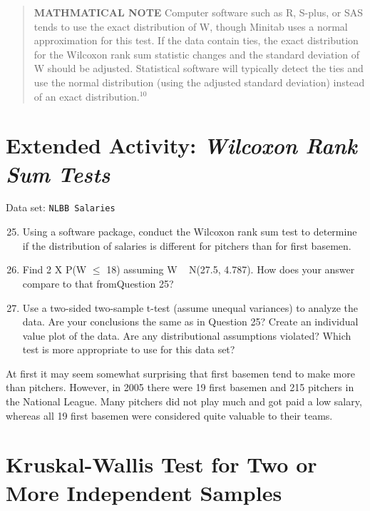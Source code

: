 \documentclass[
]{report}
\begin{document}
\begin{quote}
\textbf{MATHMATICAL NOTE} Computer software such as R, S-plus, or SAS tends to use the exact distribution of W, though Minitab uses a normal approximation for this test. If the data contain ties, the exact distribution for the Wilcoxon rank sum statistic changes and the standard deviation of W should be adjusted. Statistical software will typically detect the ties and use the normal distribution (using the adjusted standard deviation) instead of an exact distribution.\(^{10}\)
\end{quote}

\hypertarget{extended-activity-wilcoxon-rank-sum-tests}{%
\section*{\texorpdfstring{Extended Activity: \emph{Wilcoxon Rank Sum Tests}}{Extended Activity: Wilcoxon Rank Sum Tests}}\label{extended-activity-wilcoxon-rank-sum-tests}}

Data set: \texttt{NLBB\ Salaries}

\begin{enumerate}
 \setcounter{enumi}{24}
 \item Using a software package, conduct the Wilcoxon rank sum test to determine if the distribution of salaries is different for pitchers than for first basemen.
 \item Find 2 X P(W $\leq$ 18) assuming W ~ N(27.5, 4.787). How does your answer compare to that fromQuestion 25?
 \item Use a two-sided two-sample t-test (assume unequal variances) to analyze the data. Are your conclusions the same as in Question 25? Create an individual value plot of the data. Are any distributional assumptions violated? Which test is more appropriate to use for this data set?
\end{enumerate}

At first it may seem somewhat surprising that first basemen tend to make more than pitchers. However, in 2005 there were 19 first basemen and 215 pitchers in the National League. Many pitchers did not play much and got paid a low salary, whereas all 19 first basemen were considered quite valuable to their teams.

\hypertarget{kruskal-wallis-test-for-two-or-more-independent-samples}{%
\section{\texorpdfstring{\textbf{Kruskal-Wallis Test for Two or More Independent Samples}}{Kruskal-Wallis Test for Two or More Independent Samples}}\label{kruskal-wallis-test-for-two-or-more-independent-samples}}
\end{document}
